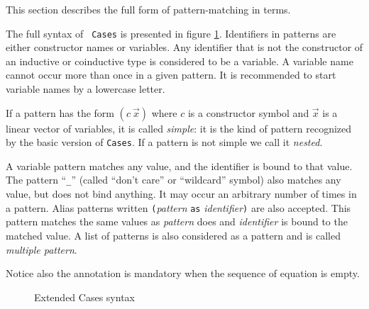 {}

\label{Mult-Cases-full}

This section describes the full form of pattern-matching in {\Coq} terms.

\label{implementation} The full syntax of {\tt
Cases} is presented in figure \ref{cases-grammar}.  Identifiers in
patterns are either constructor names or variables. Any identifier
that is not the constructor of an inductive or coinductive type is
considered to be a variable. A variable name cannot occur more than
once in a given pattern. It is recommended to start variable names by
a lowercase letter.

If a pattern has the form $(c~\vec{x})$ where $c$ is a constructor
symbol and $\vec{x}$ is a linear vector of variables, it is called
{\em simple}: it is the kind of pattern recognized by the basic
version of {\tt Cases}. If a pattern is
not simple we call it {\em nested}.

A variable pattern matches any value, and the identifier is bound to
that value. The pattern ``\texttt{\_}'' (called ``don't care'' or
``wildcard'' symbol) also matches any value, but does not bind anything. It
may occur an arbitrary number of times in a pattern. Alias patterns
written \texttt{(}{\sl pattern} \texttt{as} {\sl identifier}\texttt{)} are
also accepted. This pattern matches the same values as {\sl pattern}
does and {\sl identifier} is bound to the matched value.  A list of
patterns is also considered as a pattern and is called {\em multiple
pattern}.

Notice also the annotation is mandatory when the sequence of equation is
empty.

\begin{figure}[t]
\caption{Extended Cases syntax}
\label{cases-grammar}
\end{figure}

